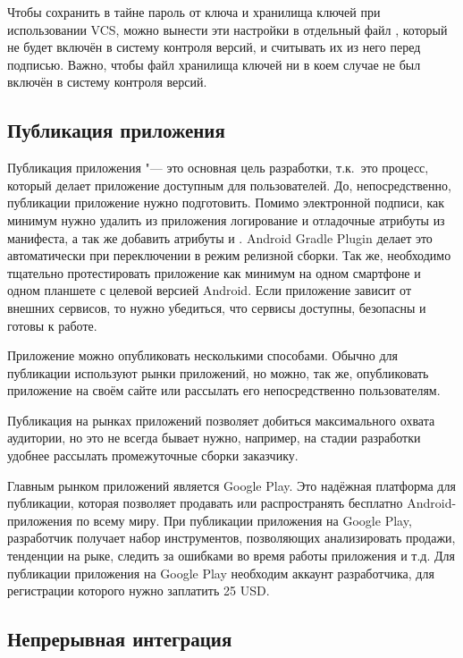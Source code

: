 Чтобы сохранить в тайне пароль от ключа и хранилища ключей при использовании VCS, можно вынести эти настройки в отдельный файл , который не будет включён в систему контроля версий, и считывать их из него перед подписью.
Важно, чтобы файл хранилища ключей ни в коем случае не был включён в систему контроля версий.

\subsection{Публикация приложения}
\label{subsec:publish}

Публикация приложения "--- это основная цель разработки, т.к.\ это процесс, который делает приложение доступным для пользователей.
До, непосредственно, публикации приложение нужно подготовить.
Помимо электронной подписи, как минимум нужно удалить из приложения логирование  и отладочные атрибуты из манифеста, а так же добавить атрибуты  и .
Android Gradle Plugin делает это автоматически при переключении в режим релизной сборки.
Так же, необходимо тщательно протестировать приложение как минимум на одном смартфоне и одном планшете с целевой версией Android.
Если приложение зависит от внешних сервисов, то нужно убедиться, что сервисы доступны, безопасны и готовы к работе.

Приложение можно опубликовать несколькими способами.
Обычно для публикации используют рынки приложений, но можно, так же, опубликовать приложение на своём сайте или рассылать его непосредственно пользователям.

Публикация на рынках приложений позволяет добиться максимального охвата аудитории, но это не всегда бывает нужно, например, на стадии разработки удобнее рассылать промежуточные сборки заказчику.

Главным рынком приложений является Google Play.
Это надёжная платформа для публикации, которая позволяет продавать или распространять бесплатно Android-приложения по всему миру.
При публикации приложения на Google Play, разработчик получает набор инструментов, позволяющих анализировать продажи, тенденции на рыке, следить за ошибками во время работы приложения и т.д.
Для публикации приложения на Google Play необходим аккаунт разработчика, для регистрации которого нужно заплатить 25 USD\@.

\subsection{Непрерывная интеграция}
\label{subsec:ci}


